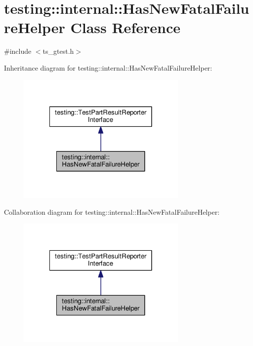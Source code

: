 \hypertarget{classtesting_1_1internal_1_1HasNewFatalFailureHelper}{\section{testing\-:\-:internal\-:\-:Has\-New\-Fatal\-Failure\-Helper Class Reference}
\label{classtesting_1_1internal_1_1HasNewFatalFailureHelper}
}


{\ttfamily \#include $<$ts\-\_\-gtest.\-h$>$}



Inheritance diagram for testing\-:\-:internal\-:\-:Has\-New\-Fatal\-Failure\-Helper\-:\nopagebreak
\begin{figure}[H]
\begin{center}
\leavevmode
\includegraphics[width=234pt]{classtesting_1_1internal_1_1HasNewFatalFailureHelper__inherit__graph}
\end{center}
\end{figure}


Collaboration diagram for testing\-:\-:internal\-:\-:Has\-New\-Fatal\-Failure\-Helper\-:\nopagebreak
\begin{figure}[H]
\begin{center}
\leavevmode
\includegraphics[width=234pt]{classtesting_1_1internal_1_1HasNewFatalFailureHelper__coll__graph}
\end{center}
\end{figure}
